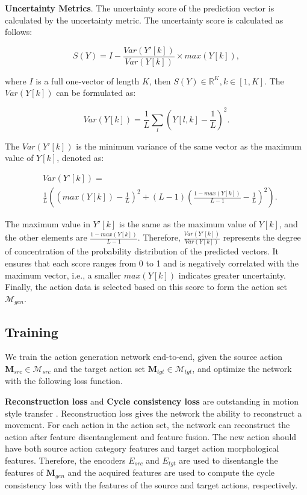 \textbf{Uncertainty Metrics}. 
The uncertainty score of the prediction vector is calculated by the uncertainty metric. The uncertainty score is calculated as follows:

\begin{equation}\label{e7}
S(Y)=I-\frac{Var(Y'[k])}{Var(Y[k])}\times max(Y[k]),
\end{equation}

\noindent where $I$ is a full one-vector of length $K$, then $S(Y)\in\mathbb{R}^K, k\in [1,K]$. The $Var(Y[k])$ can be formulated as:

\begin{equation}\label{e8}
Var(Y[k])=\frac{1}{L}\sum_l (Y[l,k]-\frac{1}{L})^2.
\end{equation}

\noindent The $Var(Y'[k])$ is the minimum variance of the same vector as the maximum value of $Y[k]$, denoted as:

\begin{equation}\label{e9}
\begin{aligned}
&Var(Y’[k])=\\
&\frac{1}{L}((max(Y[k])-\frac{1}{L})^2+(L-1)(\frac{1-max(Y[k])}{L-1}-\frac{1}{L})^2).
\end{aligned}
\end{equation}

\noindent The maximum value in $Y'[k]$ is the same as the maximum value of $Y[k]$, and the other elements are $\frac{1-max(Y[k])}{L-1}$. 
Therefore, $\frac{Var(Y'[k])}{Var(Y[k])}$ represents the degree of concentration of the probability distribution of the predicted vectors. It ensures that each score ranges from 0 to 1 and is negatively correlated with the maximum vector, i.e., a smaller $max(Y[k])$ indicates greater uncertainty.
Finally, the action data is selected based on this score to form the action set $\mathcal{M}_{gen}$.

\subsection{Training}

We train the action generation network end-to-end, given the source action $\textbf{M}_{src}\in\mathcal{M}_{src}$ and the target action set $\textbf{M}_{tgt}\in\mathcal{M}_{tgt}$, and optimize the network with the following loss function. 

\textbf{Reconstruction loss} and \textbf{Cycle consistency loss} are outstanding in motion style transfer \cite{jang2022motion, aberman2020unpaired, ParkSoomin2021Diverse, 2016A}.
Reconstruction loss gives the network the ability to reconstruct a movement. For each action in the action set, the network can reconstruct the action after feature disentanglement and feature fusion. The new action should have both source action category features and target action morphological features. Therefore, the encoders $E_{src}$ and $E_{tgt}$ are used to disentangle the features of $\textbf{M}_{gen}$ and the acquired features are used to compute the cycle consistency loss with the features of the source and target actions, respectively. 

